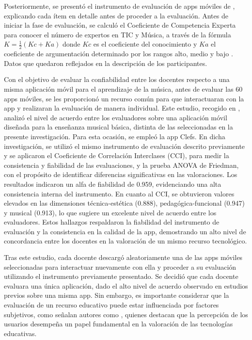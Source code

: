 \documentclass[spanish]{textolivre}
\begin{document}
Posteriormente, se presentó el instrumento de evaluación de apps móviles de \textcite{leon-garrido2024}, explicando cada ítem en detalle antes de proceder a la evaluación. Antes de iniciar la fase de evaluación, se calculó el Coeficiente de Competencia Experta para conocer el número de expertos en TIC y Música, a través de la fórmula \begin{math} K = \frac{1}{2}(Kc + Ka)\end{math}
donde $Kc$ es el coeficiente del conocimiento y $Ka$ el coeficiente de argumentación determinado por los rangos alto, medio y bajo \cite{cabero-almenara2020, herrera2023}. Datos que quedaron reflejados en la descripción de los participantes. 

Con el objetivo de evaluar la confiabilidad entre los docentes respecto a una misma aplicación móvil para el aprendizaje de la música, antes de evaluar las 60 apps móviles, se les proporcionó un recurso común para que interactuaran con la app y realizaran la evaluación de manera individual. Este estudio, recogido en \textcite{leon-garrido2025a}, analizó el nivel de acuerdo entre los evaluadores sobre una aplicación móvil diseñada para la enseñanza musical básica, distinta de las seleccionadas en la presente investigación. Para esta ocasión, se empleó la app Clefs. En dicha investigación, se utilizó el mismo instrumento de evaluación descrito previamente y se aplicaron el Coeficiente de Correlación Interclases (CCI), para medir la consistencia y fiabilidad de las evaluaciones, y la prueba ANOVA de Friedman, con el propósito de identificar diferencias significativas en las valoraciones. Los resultados indicaron un alfa de fiabilidad de 0.959, evidenciando una alta consistencia interna del instrumento. En cuanto al CCI, se obtuvieron valores elevados en las dimensiones técnica-estética (0.888), pedagógica-funcional (0.947) y musical (0.913), lo que sugiere un excelente nivel de acuerdo entre los evaluadores. Estos hallazgos respaldaron la fiabilidad del instrumento de evaluación y la consistencia en la calidad de la app, demostrando un alto nivel de concordancia entre los docentes en la valoración de un mismo recurso tecnológico.

Tras este estudio, cada docente descargó aleatoriamente una de las apps móviles seleccionadas para interactuar nuevamente con ella y proceder a su evaluación utilizando el instrumento previamente presentado. Se decidió que cada docente evaluara una única aplicación, dado el alto nivel de acuerdo observado en estudios previos sobre una misma app. Sin embargo, es importante considerar que la evaluación de un recurso educativo puede estar influenciada por factores subjetivos, como señalan autores como \textcite{joachims2017, quezada-bolanos2023, dominguez-lloria2023}, quienes destacan que la percepción de los usuarios desempeña un papel fundamental en la valoración de las tecnologías educativas.
\end{document}
